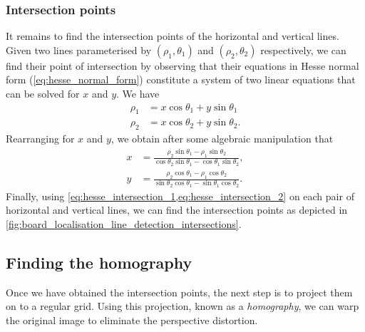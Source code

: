 \documentclass[../main.tex]{subfiles}
\begin{document}
\subsubsection{Intersection points}
It remains to find the intersection points of the horizontal and vertical lines.
Given two lines parameterised by $(\rho_1,\theta_1)$ and $(\rho_2,\theta_2)$ respectively, we can find their point of intersection by observing that their equations in Hesse normal form (\cref{eq:hesse_normal_form}) constitute a system of two linear equations that can be solved for $x$ and $y$. 
We have
\begin{align*}
    \rho_1 &= x \cos \theta_1 + y \sin \theta_1 \\
    \rho_2 &= x \cos \theta_2 + y \sin \theta_2.
\end{align*}
Rearranging for $x$ and $y$, we obtain after some algebraic manipulation that
\begin{align}
    \label{eq:hesse_intersection_1}
    x &= \frac{\rho_2 \sin \theta_1 - \rho_1 \sin \theta_2}{\cos \theta_2 \sin \theta_1 - \cos \theta_1 \sin \theta_2}, \\
    \label{eq:hesse_intersection_2}
    y &= \frac{\rho_2 \cos \theta_1 - \rho_1 \cos \theta_2}{\sin \theta_2 \cos \theta_1 - \sin \theta_1 \cos \theta_2}.
\end{align}
Finally, using \cref{eq:hesse_intersection_1,eq:hesse_intersection_2} on each pair of horizontal and vertical lines, we can find the intersection points as depicted in \cref{fig:board_localisation_line_detection_intersections}.

\subsection{Finding the homography}
\label{sec:find_homography}
Once we have obtained the intersection points, the next step is to project them on to a regular grid. 
Using this projection, known as a \emph{homography}, we can warp the original image to eliminate the perspective distortion. 
\end{document}
